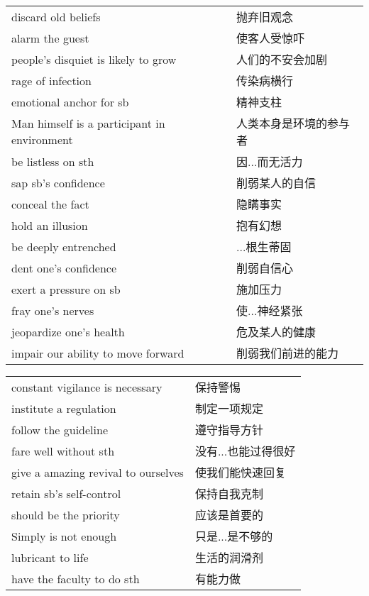 \begin{tabular}{ll}
    discard old beliefs                         & 抛弃旧观念       \\
    alarm the guest                             & 使客人受惊吓      \\
    people's disquiet is likely to grow         & 人们的不安会加剧    \\
    rage of infection                           & 传染病横行       \\
    emotional anchor for sb                     & 精神支柱        \\
    Man himself is a participant in environment & 人类本身是环境的参与者 \\
    be listless on sth                          & 因...而无活力    \\
    sap sb's confidence                         & 削弱某人的自信     \\
    conceal the fact                            & 隐瞒事实        \\
    hold an illusion                            & 抱有幻想        \\
    be deeply entrenched                        & ...根生蒂固     \\
    dent one's confidence                       & 削弱自信心       \\
    exert a pressure on sb                      & 施加压力        \\
    fray one's nerves                           & 使...神经紧张    \\
    jeopardize one's health                     & 危及某人的健康     \\
    impair our ability to move forward          & 削弱我们前进的能力   \\
\end{tabular}

\begin{tabular}{ll}
    constant vigilance is necessary     & 保持警惕        \\
    institute a regulation              & 制定一项规定      \\
    follow the guideline                & 遵守指导方针      \\
    fare well without sth               & 没有...也能过得很好 \\
    give a amazing revival to ourselves & 使我们能快速回复    \\
    retain sb's self-control            & 保持自我克制      \\
    should be the priority              & 应该是首要的      \\
    Simply is not enough                & 只是...是不够的   \\
    lubricant to life                   & 生活的润滑剂      \\
    have the faculty to do sth          & 有能力做        \\
\end{tabular}

